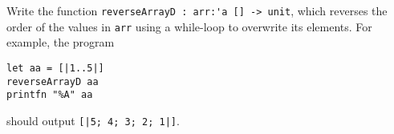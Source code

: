 Write the function
\lstinline{reverseArrayD : arr:'a [] -> unit}, which reverses the
order of the values in \lstinline{arr} using a while-loop to overwrite
its elements. For example, the program
\begin{verbatim}
let aa = [|1..5|]
reverseArrayD aa
printfn "%A" aa
\end{verbatim}
should output \lstinline{[|5; 4; 3; 2; 1|]}.
